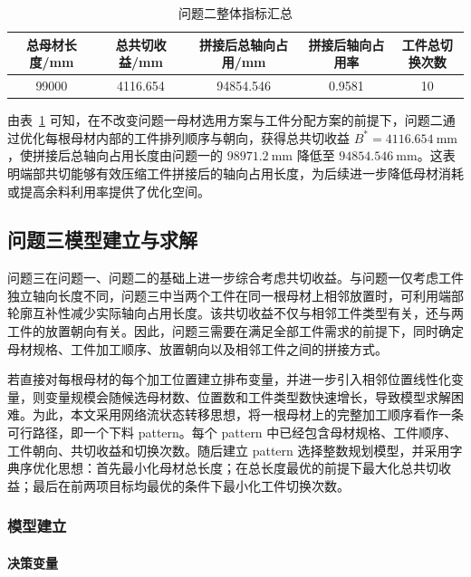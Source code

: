 \documentclass[UTF8]{ctexart}
\begin{document}
\begin{table}[h]
    \centering
    \caption{问题二整体指标汇总}
    \label{tab:res2_summary}
    \begin{tabular}{ccccc}
        \toprule
        总母材长度/mm & 总共切收益/mm & 拼接后总轴向占用/mm & 拼接后轴向占用率 & 工件总切换次数 \\
        \midrule
        99000 & 4116.654 & 94854.546 & 0.9581 & 10 \\
        \bottomrule
    \end{tabular}
\end{table}

由表~\ref{tab:res2_summary} 可知，在不改变问题一母材选用方案与工件分配方案的前提下，问题二通过优化每根母材内部的工件排列顺序与朝向，获得总共切收益 $B^*=4116.654\ \mathrm{mm}$，使拼接后总轴向占用长度由问题一的 $98971.2\ \mathrm{mm}$ 降低至 $94854.546\ \mathrm{mm}$。这表明端部共切能够有效压缩工件拼接后的轴向占用长度，为后续进一步降低母材消耗或提高余料利用率提供了优化空间。

\subsection{问题三模型建立与求解}
问题三在问题一、问题二的基础上进一步综合考虑共切收益。与问题一仅考虑工件独立轴向长度不同，问题三中当两个工件在同一根母材上相邻放置时，可利用端部轮廓互补性减少实际轴向占用长度。该共切收益不仅与相邻工件类型有关，还与两工件的放置朝向有关。因此，问题三需要在满足全部工件需求的前提下，同时确定母材规格、工件加工顺序、放置朝向以及相邻工件之间的拼接方式。

若直接对每根母材的每个加工位置建立排布变量，并进一步引入相邻位置线性化变量，则变量规模会随候选母材数、位置数和工件类型数快速增长，导致模型求解困难。为此，本文采用网络流状态转移思想，将一根母材上的完整加工顺序看作一条可行路径，即一个下料 pattern。每个 pattern 中已经包含母材规格、工件顺序、工件朝向、共切收益和切换次数。随后建立 pattern 选择整数规划模型，并采用字典序优化思想：首先最小化母材总长度；在总长度最优的前提下最大化总共切收益；最后在前两项目标均最优的条件下最小化工件切换次数。

\subsubsection{模型建立}

\paragraph{决策变量}
\end{document}
